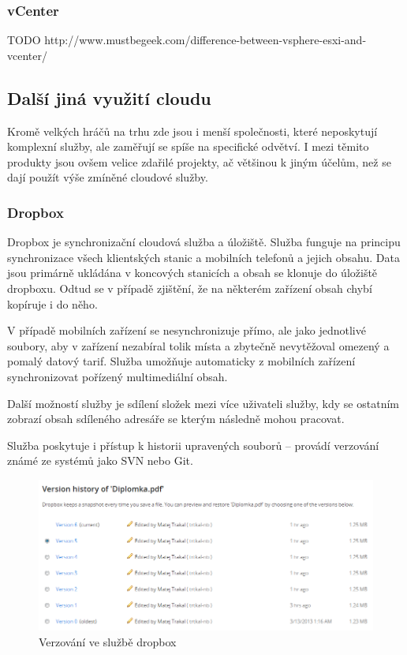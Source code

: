 \subsubsection{vCenter}
TODO
http://www.mustbegeek.com/difference-between-vsphere-esxi-and-vcenter/

\subsection{Další jiná využití cloudu}
Kromě velkých hráčů na trhu zde jsou i menší společnosti, které neposkytují komplexní služby, ale zaměřují se spíše na specifické odvětví. I mezi těmito produkty jsou ovšem velice zdařilé projekty, ač většinou k jiným účelům, než se dají použít výše zmíněné cloudové služby.

\subsubsection{Dropbox}
Dropbox je synchronizační cloudová služba a úložiště. Služba funguje na principu synchronizace všech klientských stanic a mobilních telefonů a jejich obsahu. Data jsou primárně ukládána v koncových stanicích a obsah se klonuje do úložiště dropboxu. Odtud se v případě zjištění, že na některém zařízení obsah chybí kopíruje i do něho. 

V případě mobilních zařízení se nesynchronizuje přímo, ale jako jednotlivé soubory, aby v zařízení nezabíral tolik místa a zbytečně nevytěžoval omezený a pomalý datový tarif. Služba umožňuje automaticky z mobilních zařízení synchronizovat pořízený multimediální obsah.

Další možností služby je sdílení složek mezi více uživateli služby, kdy se ostatním zobrazí obsah sdíleného adresáře se kterým následně mohou pracovat.

Služba poskytuje i přístup k historii upravených souborů -- provádí verzování známé ze systémů jako SVN nebo Git.

\begin{figure}[h]
	\centering
		\includegraphics[width=1.00\textwidth]{ext/dropbox_versioning.png}
	\caption{Verzování ve službě dropbox}
	\label{fig:dropbox_versioning}
\end{figure}

